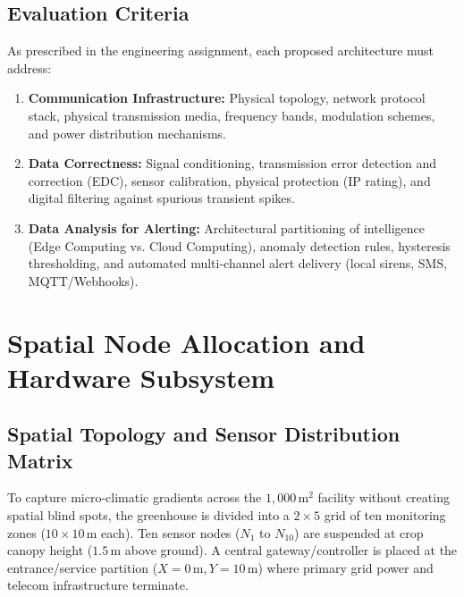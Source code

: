 \documentclass[12pt]{article}
\begin{document}
\subsection{Evaluation Criteria}
As prescribed in the engineering assignment, each proposed architecture must address:
\begin{enumerate}
    \item \textbf{Communication Infrastructure:} Physical topology, network protocol stack, physical transmission media, frequency bands, modulation schemes, and power distribution mechanisms.
    \item \textbf{Data Correctness:} Signal conditioning, transmission error detection and correction (EDC), sensor calibration, physical protection (IP rating), and digital filtering against spurious transient spikes.
    \item \textbf{Data Analysis for Alerting:} Architectural partitioning of intelligence (Edge Computing vs. Cloud Computing), anomaly detection rules, hysteresis thresholding, and automated multi-channel alert delivery (local sirens, SMS, MQTT/Webhooks).
\end{enumerate}

\section{Spatial Node Allocation and Hardware Subsystem}

\subsection{Spatial Topology and Sensor Distribution Matrix}
To capture micro-climatic gradients across the $1{,}000\,\text{m}^2$ facility without creating spatial blind spots, the greenhouse is divided into a $2 \times 5$ grid of ten monitoring zones ($10 \times 10\,\text{m}$ each). Ten sensor nodes ($N_1$ to $N_{10}$) are suspended at crop canopy height ($1.5\,\text{m}$ above ground). A central gateway/controller is placed at the entrance/service partition ($X=0\,\text{m}, Y=10\,\text{m}$) where primary grid power and telecom infrastructure terminate.
\end{document}

